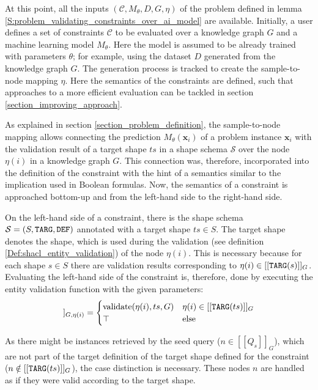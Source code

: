 At this point, all the inputs $(\mathcal{C}, M_\theta, D, G, \eta)$ of the problem defined in lemma \ref{S:problem_validating_constraints_over_ai_model} are available. Initially, a user defines a set of constraints $\mathcal{C}$ to be evaluated over a knowledge graph $G$ and a machine learning model $M_\theta$. Here the model is assumed to be already trained with parameters $\theta$; for example, using the dataset $D$ generated from the knowledge graph $G$. The generation process is tracked to create the sample-to-node mapping $\eta$. Here the semantics of the constraints are defined, such that approaches to a more efficient evaluation can be tackled in section \ref{section_improving_approach}.

As explained in section \ref{section_problem_definition}, the sample-to-node mapping allows connecting the prediction $M_\theta(\mathbf{x}_i)$ of a problem instance $\mathbf{x}_i$ with the validation result of a target shape $ts$ in a shape schema $\mathcal{S}$ over the node $\eta(i)$ in a knowledge graph $G$. This connection was, therefore, incorporated into the definition of the constraint with the hint of a semantics similar to the implication used in Boolean formulas. Now, the semantics of a constraint is approached bottom-up and from the left-hand side to the right-hand side. 

On the left-hand side of a constraint, there is the shape schema $\mathcal{S} = (S, \texttt{TARG}, \texttt{DEF})$ annotated with a target shape $ts \in S$. The target shape denotes the shape, which is used during the validation (see definition \ref{Def:shacl_entity_validation}) of the node $\eta(i)$. This is necessary because for each shape $s \in S$ there are validation results corresponding to $\eta(i) \in [[\texttt{TARG}(s)]]_G$. Evaluating the left-hand side of the constraint is, therefore, done by executing the entity validation function with the given parameters: 
\begin{gather}
    [[\mathcal{S}\big|_{ts}]]_{G,\eta(i)} = \begin{cases} \text{validate}(\eta(i),ts,G) & \eta(i) \in [[\uri{TARG}(ts)]]_G\\ \top & \text{else}
    \label{F:constraint_eval_1} \end{cases}
\end{gather}

As there might be instances retrieved by the seed query ($n \in [[Q_s]]_G$), which are not part of the target definition of the target shape defined for the constraint ($n \notin [[\texttt{TARG}(ts)]]_G$), the case distinction is necessary. These nodes $n$ are handled as if they were valid according to the target shape.


